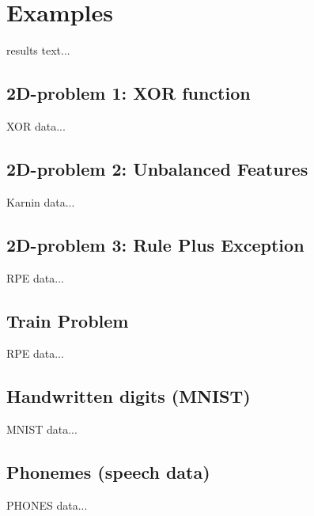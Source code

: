 \chapter{Examples} \label{chap:examples}
results text...

\section{2D-problem 1: XOR function} \label{sec:dataset_xor}
XOR data...

\section{2D-problem 2: Unbalanced Features} \label{sec:dataset_karnin}
Karnin data...

\section{2D-problem 3: Rule Plus Exception} \label{sec:dataset_rpe}
RPE data...

\section{Train Problem} \label{sec:dataset_train}
RPE data...

\section{Handwritten digits (MNIST)} \label{sec:dataset_mnist}
MNIST data... \citep{online:mnist}

\section{Phonemes (speech data)} \label{sec:dataset_phonemes}
PHONES data...

